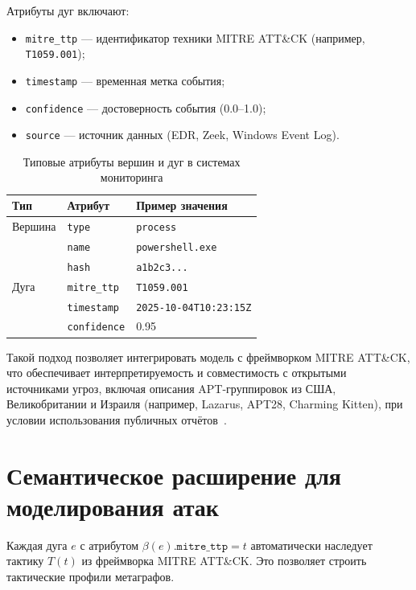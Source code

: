 Атрибуты дуг включают:
\begin{itemize}
    \item \texttt{mitre\_ttp} — идентификатор техники MITRE ATT\&CK (например, \texttt{T1059.001});
    \item \texttt{timestamp} — временная метка события;
    \item \texttt{confidence} — достоверность события (0.0–1.0);
    \item \texttt{source} — источник данных (EDR, Zeek, Windows Event Log).
\end{itemize}



\begin{table}[h]
    \centering
    \caption{Типовые атрибуты вершин и дуг в системах мониторинга}
    \label{tab:attributes}
    \begin{tabular}{lll}
        \toprule
        Тип & Атрибут & Пример значения \\
        \midrule
        Вершина & \texttt{type} & \texttt{process} \\
                & \texttt{name} & \texttt{powershell.exe} \\
                & \texttt{hash} & \texttt{a1b2c3...} \\
        Дуга    & \texttt{mitre\_ttp} & \texttt{T1059.001} \\
                & \texttt{timestamp} & \texttt{2025-10-04T10:23:15Z} \\
                & \texttt{confidence} & 0.95 \\
        \bottomrule
    \end{tabular}
\end{table}

Такой подход позволяет интегрировать модель с фреймворком MITRE ATT\&CK, что обеспечивает интерпретируемость и совместимость с открытыми источниками угроз, включая описания APT-группировок из США, Великобритании и Израиля (например, Lazarus, APT28, Charming Kitten), при условии использования публичных отчётов~\cite{Mandiant2023,CrowdStrike2024}.

\section{Семантическое расширение для моделирования атак}\label{sec:ch2/sec3}

Каждая дуга $e$ с атрибутом $\beta(e).\texttt{mitre\_ttp} = t$ автоматически наследует тактику $T(t)$ из фреймворка MITRE ATT\&CK. Это позволяет строить тактические профили метаграфов.


